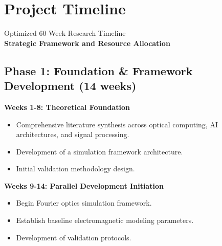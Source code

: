 \documentclass[conference]{IEEEtran}
\begin{document}
\section{Project Timeline}
Optimized 60-Week Research Timeline\\[2mm]
\textbf{Strategic Framework and Resource Allocation}

\subsection*{Phase 1: Foundation \& Framework Development (14 weeks)}
\textbf{Weeks 1-8: Theoretical Foundation}
\begin{itemize}
    \item Comprehensive literature synthesis across optical computing, AI architectures, and signal processing.
    \item Development of a simulation framework architecture.
    \item Initial validation methodology design.
\end{itemize}
\textbf{Weeks 9-14: Parallel Development Initiation}
\begin{itemize}
    \item Begin Fourier optics simulation framework.
    \item Establish baseline electromagnetic modeling parameters.
    \item Development of validation protocols.
\end{itemize}
\end{document}
